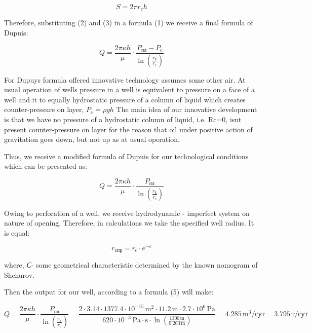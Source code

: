 \begin{multicols}{2}
\begin{equation}
S = 2\pi r_{\text{c}} h
\end{equation}

Therefore, substituting (2) and (3) in a formula (1) we receive a final
formula of Dupuis:

\begin{equation}
Q = \frac{2 \pi \kappa h}{\mu} \cdot \frac{P_{\text{пл}} - P_{\text{c}}}{\ln \left( \frac{r_{\text{k}}}{r_{\text{c}}} \right)}
\end{equation}

For Dupuy\textquotesingle s formula offered innovative technology
assumes some other air. At usual operation of wells pressure in a well
is equivalent to pressure on a face of a well and it to equally
hydrostatic pressure of a column of liquid which creates
counter-pressure on layer, $P_{\text{c}} = \rho g h$
The main idea of our innovative development is that we have no pressure
of a hydrostatic column of liquid, i.e. Rc=0, isn\textquotesingle t
present counter-pressure on layer for the reason that oil under positive
action of gravitation goes down, but not up as at usual operation.

Thus, we receive a modified formula of Dupuis for our technological
conditions which can be presented as:

\begin{equation}
Q = \frac{2 \pi \kappa h}{\mu} \cdot \frac{P_{\text{пл}}}{\ln \left( \frac{r_{\text{k}}}{r_{\text{c}}} \right)}
\end{equation}

Owing to perforation of a well, we receive hydrodynamic - imperfect
system on nature of opening. Therefore, in calculations we take the
specified well radius. It is equal:

\begin{equation}
r_{\text{спр}} = r_{\text{c}} \cdot e^{-c}
\end{equation}

where, \emph{С}- some geometrical characteristic determined by the known
nomogram of Shchurov.

Then the output for our well, according to a formula (5) will make:
\end{multicols}

\begin{equation}
Q = \frac{2 \pi \kappa h}{\mu} \cdot \frac{P_{\text{пл}}}{\ln \left( \frac{r_{\text{k}}}{r_{\text{c}}} \right)} = \frac{2 \cdot 3.14 \cdot 1377.4 \cdot 10^{-15} \, \text{m}^2 \cdot 11.2 \, \text{m} \cdot 2.7 \cdot 10^6 \, \text{Pa}}{620 \cdot 10^{-3} \, \text{Pa} \cdot \text{s} \cdot \ln \left( \frac{1300 \, \text{m}}{0.263 \, \text{m}} \right)} = 4.285 \, \text{m}^3/\text{сут} = 3.795 \, \text{т}/\text{сут}
\end{equation}

